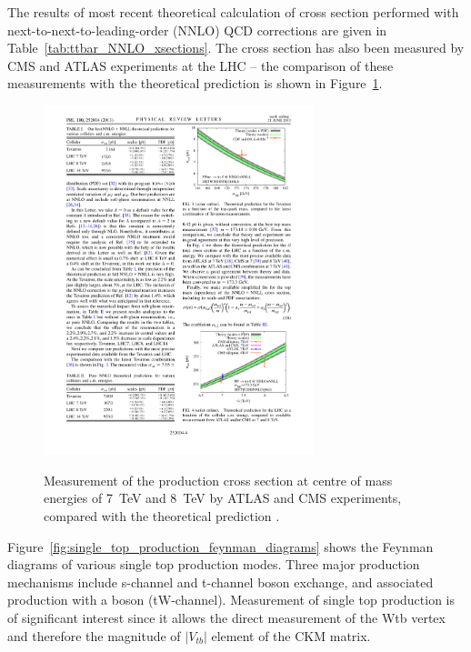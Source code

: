 The results of most recent theoretical calculation of \ttbar cross section performed with next-to-next-to-leading-order
(NNLO) QCD corrections \autocite{NNLO_ttbar} are given in Table~\ref{tab:ttbar_NNLO_xsections}. The cross section has
also been measured by CMS and ATLAS experiments at the LHC -- the comparison of these measurements with the theoretical
prediction is shown in Figure~\ref{fig:xsections_comparison_NNLO}.




\begin{figure}[!hbtp]
   \centering
   {\includegraphics[width=0.7\textwidth]{xsections_comparison_NNLO}}
   \caption[Measurement of the \ttbar production cross section.]{Measurement of the \ttbar production cross section at
   centre of mass energies of \SI{7}{\TeV} and \SI{8}{\TeV} by ATLAS and CMS experiments, compared with the theoretical
   prediction \autocite{NNLO_ttbar}.}
   \label{fig:xsections_comparison_NNLO}
\end{figure}


Figure~\ref{fig:single_top_production_feynman_diagrams} shows the Feynman diagrams of various single top production
modes. Three major production mechanisms include s-channel and t-channel \W boson exchange, and associated production
with a \W boson (tW-channel). Measurement of single top production is of significant interest since it allows the direct
measurement of the Wtb vertex and therefore the magnitude of $|V_{tb}|$ element of the CKM matrix.


